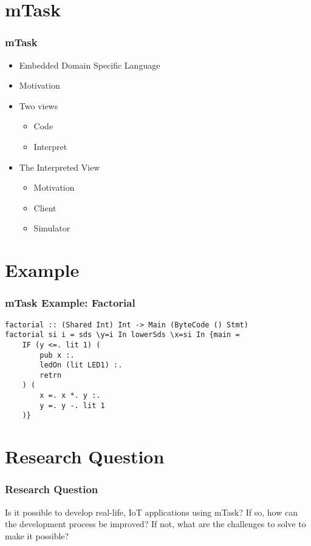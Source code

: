 \documentclass[department=icis, notes={show notes}, slidesperpage=1, official=true,showdate=true,slidenumbers=relative]{beamerruhuisstijl}
\begin{document}
\section{mTask}
\begin{frame}[fragile]
  \frametitle{mTask}
  \begin{itemize}
      \setlength\itemsep{1em}
      \item Embedded Domain Specific Language
      \item Motivation
      \item Two views
      \begin{itemize}[label=$\diamond$]
          \item Code
          \item Interpret
      \end{itemize}
      \item The Interpreted View
      \begin{itemize}[label=$\diamond$]
          \item Motivation
          \item Client
          \item Simulator
      \end{itemize}
  \end{itemize}
\end{frame}

\section{Example}
\begin{frame}[fragile,c]
  \frametitle{mTask Example: Factorial}
  \begin{lstlisting}
factorial :: (Shared Int) Int -> Main (ByteCode () Stmt)
factorial si i = sds \y=i In lowerSds \x=si In {main =
    IF (y <=. lit 1) (
		pub x :. 
		ledOn (lit LED1) :.
		retrn
	) (
		x =. x *. y :.
		y =. y -. lit 1
	)}
    \end{lstlisting}
\end{frame}

\section{Research Question}
\begin{frame}[plain,c]
    \frametitle{Research Question}
    \begin{center}
        Is it possible to develop real-life, IoT applications using mTask? If so, how can the development process be improved? If not, what are the challenges to solve to make it possible?
    \end{center}
\end{frame}
\end{document}
